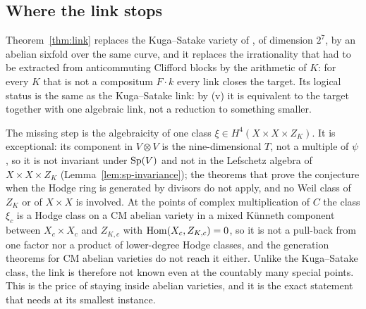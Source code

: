 \subsection{Where the link stops}\label{ssec:f2stop2}

Theorem~\ref{thm:link} replaces the Kuga--Satake variety of \cite[Thm.~21.4]{BMB26}, of dimension $2^{7}$, by an abelian sixfold over the same curve, and it replaces the irrationality that had to be extracted from anticommuting Clifford blocks by the arithmetic of $K$: for every $K$ that is not a compositum $F\cdot k$ every link closes the target. Its logical status is the same as the Kuga--Satake link: by (v) it is equivalent to the target together with one algebraic link, not a reduction to something smaller.

The missing step is the algebraicity of one class $\xi\in H^{4}(X\times X\times Z_{K})$. It is exceptional: its component in $V\otimes V$ is the nine-dimensional $T$, not a multiple of $\psi$, so it is not invariant under $\mathrm{Sp}(V)$ and not in the Lefschetz algebra of $X\times X\times Z_{K}$ (Lemma~\ref{lem:sp-invariance}); the theorems that prove the conjecture when the Hodge ring is generated by divisors do not apply, and no Weil class of $Z_{K}$ or of $X\times X$ is involved. At the points of complex multiplication of $C$ the class $\xi_{c}$ is a Hodge class on a CM abelian variety in a mixed K\"unneth component between $X_{c}\times X_{c}$ and $Z_{K,c}$ with $\mathrm{Hom}(X_{c},Z_{K,c})=0$, so it is not a pull-back from one factor nor a product of lower-degree Hodge classes, and the generation theorems for CM abelian varieties do not reach it either. Unlike the Kuga--Satake class, the link is therefore not known even at the countably many special points. This is the price of staying inside abelian varieties, and it is the exact statement that \Fii{} needs at its smallest instance.
